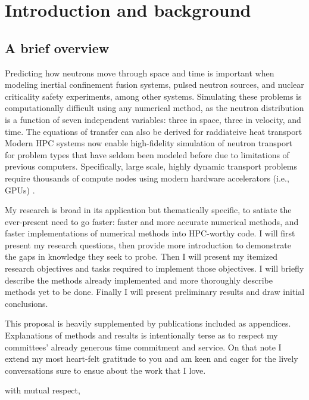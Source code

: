 \chapter{Introduction and background}
\label{ch-intro}

\section {A brief overview}
Predicting how neutrons move through space and time is important when modeling inertial confinement fusion systems, pulsed neutron sources, and nuclear criticality safety experiments, among other systems.
Simulating these problems is computationally difficult using any numerical method, as the neutron distribution is a function of seven independent variables: three in space, three in velocity, and time.
The equations of transfer can also be derived for raddiateive heat transport 
Modern HPC systems now enable high-fidelity simulation of neutron transport for problem types that have seldom been modeled before due to limitations of previous computers. %
Specifically, large scale, highly dynamic transport problems require thousands of compute nodes using modern hardware accelerators (i.e., GPUs) \cite{hamilton_continuous-energy_2019, romano_openmc_nodate}.

My research is broad in its application but thematically specific, to satiate the ever-present need to go faster: faster and more accurate numerical methods, and faster implementations of numerical methods into HPC-worthy code.
I will first present my research questions, then provide more introduction to demonstrate the gaps in knowledge they seek to probe.
Then I will present my itemized research objectives and tasks required to implement those objectives.
I will briefly describe the methods already implemented and more thoroughly describe methods yet to be done.
Finally I will present preliminary results and draw initial conclusions.

This proposal is heavily supplemented by publications included as appendices.
Explanations of methods and results is intentionally terse as to respect my committees' already generous time commitment and service.
On that note I extend my most heart-felt gratitude to you and am keen and eager for the lively conversations sure to ensue about the work that I love.

\hfill

with mutual respect,

